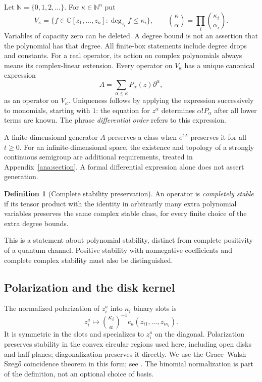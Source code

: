 \documentclass[reqno]{amsart}
\theoremstyle{definition}
\newtheorem{definition}[theorem]{Definition}
\theoremstyle{remark}
\newcommand{\C}{\mathbb C}
\newcommand{\N}{\mathbb N}
\begin{document}
Let $\N=\{0,1,2,\ldots\}$. For $\kappa\in\N^n$ put
\[
 V_\kappa=\{f\in\C[z_1,\ldots,z_n]:\deg_{z_i}f\leq\kappa_i\},
 \qquad
 \binom{\kappa}{\alpha}=\prod_i\binom{\kappa_i}{\alpha_i}.
\]
Variables of capacity zero can be deleted. A degree bound is not an
assertion that the polynomial has that degree. All finite-box statements
include degree drops and constants. For a real operator, its action on
complex polynomials always means its complex-linear extension.
Every operator on $V_\kappa$ has a unique canonical expression
\begin{equation}\label{pre:normal-order}
 A=\sum_{\alpha\leq\kappa}P_\alpha(z)\partial^\alpha,
\end{equation}
as an operator on $V_\kappa$. Uniqueness follows by applying the expression
successively to monomials, starting with $1$: the equation for $z^\alpha$
determines $\alpha!P_\alpha$ after all lower terms are known. The phrase
\emph{differential order} refers to this expression.

A finite-dimensional generator $A$ preserves a class when $e^{tA}$
preserves it for all $t\geq0$. For an infinite-dimensional space, the
existence and topology of a strongly continuous semigroup are additional
requirements, treated in Appendix~\ref{ana:section}. A formal
differential expression alone does not assert generation.

\begin{definition}[Complete stability preservation]\label{pre:complete}
An operator is \emph{completely stable} if its tensor product with the
identity in arbitrarily many extra polynomial variables preserves the
same complex stable class, for every finite choice of the extra degree
bounds.
\end{definition}
This is a statement about polynomial
stability, distinct from complete positivity of a quantum channel.
Positive stability with nonnegative coefficients and complete complex
stability must also be distinguished.

\subsection{Polarization and the disk kernel}
The normalized polarization of $z_i^a$ into $\kappa_i$ binary slots is
\[
 z_i^a\longmapsto
 \binom{\kappa_i}{a}^{-1}
 e_a(z_{i1},\ldots,z_{i\kappa_i}).
\]
It is symmetric in the slots and specializes to $z_i^a$ on the diagonal.
Polarization preserves stability in the convex circular regions used
here, including open disks and half-planes; diagonalization preserves
it directly. We use the Grace--Walsh--Szeg\H{o} coincidence
theorem in this form; see \cite{BB09,BB10II,BB09Circular}.
The binomial normalization is part of the definition, not an optional
choice of basis.\label{pre:polarization}
\end{document}
